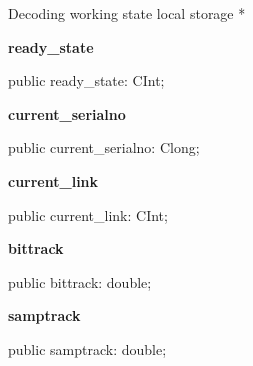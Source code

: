 \documentclass{report}
\newif\ifpdf
\begin{document}
\begin{list}{}
\begin{flushleft}
\ifpdf
\end{flushleft}
\fi


\par * Decoding working state local storage *\label{ok_vorbisfile.TOggVorbis_File-ready_state}
\item[\textbf{ready{\_}state}\hfill]
\ifpdf
\begin{flushleft}
\fi
\begin{ttfamily}
public ready{\_}state: CInt;\end{ttfamily}

\ifpdf
\end{flushleft}
\fi


\par  \label{ok_vorbisfile.TOggVorbis_File-current_serialno}
\item[\textbf{current{\_}serialno}\hfill]
\ifpdf
\begin{flushleft}
\fi
\begin{ttfamily}
public current{\_}serialno: Clong;\end{ttfamily}

\ifpdf
\end{flushleft}
\fi


\par  \label{ok_vorbisfile.TOggVorbis_File-current_link}
\item[\textbf{current{\_}link}\hfill]
\ifpdf
\begin{flushleft}
\fi
\begin{ttfamily}
public current{\_}link: CInt;\end{ttfamily}

\ifpdf
\end{flushleft}
\fi


\par  \label{ok_vorbisfile.TOggVorbis_File-bittrack}
\item[\textbf{bittrack}\hfill]
\ifpdf
\begin{flushleft}
\fi
\begin{ttfamily}
public bittrack: double;\end{ttfamily}

\ifpdf
\end{flushleft}
\fi


\par  \label{ok_vorbisfile.TOggVorbis_File-samptrack}
\item[\textbf{samptrack}\hfill]
\ifpdf
\begin{flushleft}
\fi
\begin{ttfamily}
public samptrack: double;\end{ttfamily}


\end{flushleft}
\end{list}
\end{document}
